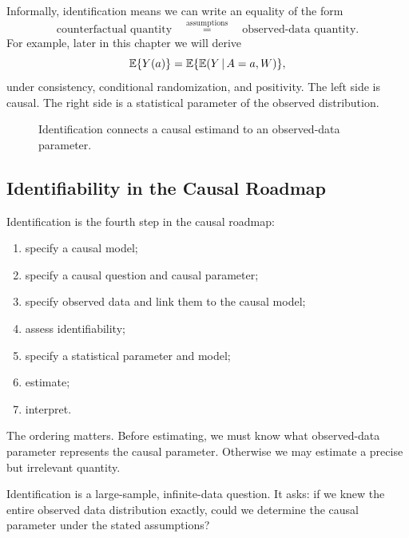 Informally, identification means we can write an equality of the form
\[
\text{counterfactual quantity}
\quad
\overset{\text{assumptions}}{=}
\quad
\text{observed-data quantity}.
\]
For example, later in this chapter we will derive
\[
\mathbb{E}\{Y(a)\}
=
\mathbb{E}\{\mathbb{E}(Y\,\vert\, A=a,W)\},
\]
under consistency, conditional randomization, and positivity. The left side is causal. The right side is a statistical parameter of the observed distribution.

\begin{figure}[H]
\centering
{}
\caption{Identification connects a causal estimand to an observed-data parameter.}
\end{figure}

\subsection{Identifiability in the Causal Roadmap}

Identification is the fourth step in the causal roadmap:
\begin{enumerate}
  \item specify a causal model;
  \item specify a causal question and causal parameter;
  \item specify observed data and link them to the causal model;
  \item assess identifiability;
  \item specify a statistical parameter and model;
  \item estimate;
  \item interpret.
\end{enumerate}

The ordering matters. Before estimating, we must know what observed-data parameter represents the causal parameter. Otherwise we may estimate a precise but irrelevant quantity.

\begin{identificationbox}
Identification is a large-sample, infinite-data question. It asks: if we knew the entire observed data distribution exactly, could we determine the causal parameter under the stated assumptions?
\end{identificationbox}


